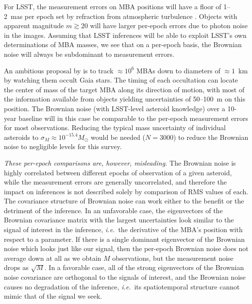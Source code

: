 \documentclass[linenumbers, onecolumn]{aastex631}
\newcommand{\ie}{\textit{i.e.\/}}
\begin{document}
For LSST, the measurement errors on MBA positions will have a floor of 1--2~mas per epoch set by refraction from atmospheric turbulence \citep{willow,trojans}.  Objects with apparent magnitude $m\gtrsim20$ will have larger per-epoch errors due to photon noise in the images.  Assuming that LSST inferences will be able to exploit LSST's own determinations of MBA masses, we see that on a per-epoch basis, the Brownian noise will always be subdominant to measurement errors.

An ambitious proposal by \citet{occultations} is to track $\approx10^6$ MBAs down to diameters of $\approx1$~km by watching them occult Gaia stars.  The timing of each occultation can locate the center of mass of the target MBA along its direction of motion, with most of the information available from objects yielding uncertainties of 50--100~m on this position.  The Brownian noise (with LSST-level asteroid knowledge) over a 10-year baseline will in this case be comparable to the per-epoch measurement errors for most observations.  Reducing the typical mass uncertainty of individual asteroids to $\sigma_M\approx 10^{-15.4} M_\odot$ would be needed ($N=3000$) to reduce the Brownian noise to negligible levels for this survey.

\emph{These per-epoch comparisons are, however, misleading.} The
Brownian noise is highly correlated between different epochs of
observation of a given asteroid, while the measurement errors are
generally uncorrelated, and therefore the impact on inferences is not
described solely by comparison of RMS values of each.  The covariance
structure of Brownian noise can work either to the benefit or the
detriment of the inference.  In an unfavorable case, the eigenvectors
of the Brownian covariance matrix with the largest uncertainties look similar to the signal of interest in the inference, \ie\ the derivative of the MBA's position with respect to a parameter.  If there is a single dominant eigenvector of the Brownian noise which looks just like our signal, then the per-epoch Brownian noise does not average down at all as we obtain $M$ observations, but the measurement noise drops as $\sqrt{M}.$  In a favorable case, all of the strong eigenvectors of the Brownian noise covariance are orthogonal to the signals of interest, and the Brownian noise causes no degradation of the inference, \ie\ its spatiotemporal structure cannot mimic that of the signal we seek.
\end{document}
